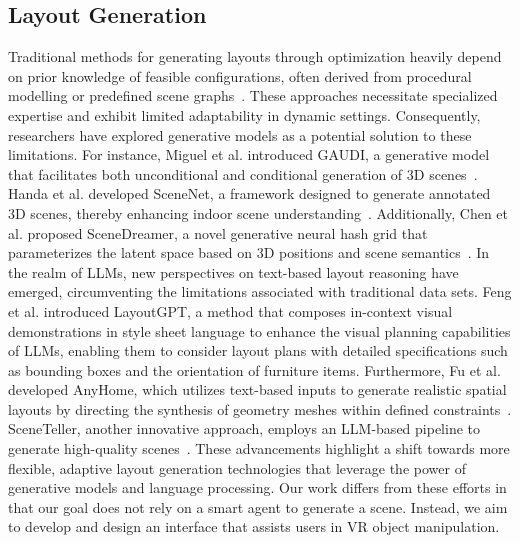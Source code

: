 \subsection{Layout Generation}
Traditional methods for generating layouts through optimization heavily depend on prior knowledge of feasible configurations, often derived from procedural modelling or predefined scene graphs~\cite{ma2018language,qi2018human}. These approaches necessitate specialized expertise and exhibit limited adaptability in dynamic settings. Consequently, researchers have explored generative models as a potential solution to these limitations. For instance, Miguel et al. introduced GAUDI, a generative model that facilitates both unconditional and conditional generation of 3D scenes~\cite{bautista2022gaudi}. Handa et al. developed SceneNet, a framework designed to generate annotated 3D scenes, thereby enhancing indoor scene understanding~\cite{handa2016scenenet}. Additionally, Chen et al. proposed SceneDreamer, a novel generative neural hash grid that parameterizes the latent space based on 3D positions and scene semantics~\cite{chen2023scenedreamer}. In the realm of LLMs, new perspectives on text-based layout reasoning have emerged, circumventing the limitations associated with traditional data sets. Feng et al. introduced LayoutGPT, a method that composes in-context visual demonstrations in style sheet language to enhance the visual planning capabilities of LLMs, enabling them to consider layout plans with detailed specifications such as bounding boxes and the orientation of furniture items. Furthermore, Fu et al. developed AnyHome, which utilizes text-based inputs to generate realistic spatial layouts by directing the synthesis of geometry meshes within defined constraints~\cite{wen2023anyhome}. SceneTeller, another innovative approach, employs an LLM-based pipeline to generate high-quality scenes~\cite{ocal2024sceneteller}. These advancements highlight a shift towards more flexible, adaptive layout generation technologies that leverage the power of generative models and language processing.
Our work differs from these efforts in that our goal does not rely on a smart agent to generate a scene. Instead, we aim to develop and design an interface that assists users in VR object manipulation.